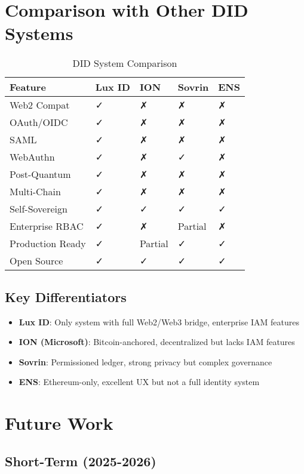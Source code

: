\documentclass[11pt,a4paper]{article}
\begin{document}
\section{Comparison with Other DID Systems}

\begin{table}[h]
\centering
\small
\begin{tabular}{@{}p{2.5cm}p{1.5cm}p{1.5cm}p{1.5cm}p{1.5cm}@{}}
\toprule
\textbf{Feature} & \textbf{Lux ID} & \textbf{ION} & \textbf{Sovrin} & \textbf{ENS} \\ \midrule
Web2 Compat & ✓ & ✗ & ✗ & ✗ \\
OAuth/OIDC & ✓ & ✗ & ✗ & ✗ \\
SAML & ✓ & ✗ & ✗ & ✗ \\
WebAuthn & ✓ & ✗ & ✓ & ✗ \\
Post-Quantum & ✓ & ✗ & ✗ & ✗ \\
Multi-Chain & ✓ & ✗ & ✗ & ✗ \\
Self-Sovereign & ✓ & ✓ & ✓ & ✓ \\
Enterprise RBAC & ✓ & ✗ & Partial & ✗ \\
Production Ready & ✓ & Partial & ✓ & ✓ \\
Open Source & ✓ & ✓ & ✓ & ✓ \\ \bottomrule
\end{tabular}
\caption{DID System Comparison}
\end{table}

\subsection{Key Differentiators}

\begin{itemize}
  \item \textbf{Lux ID}: Only system with full Web2/Web3 bridge, enterprise IAM features
  \item \textbf{ION (Microsoft)}: Bitcoin-anchored, decentralized but lacks IAM features
  \item \textbf{Sovrin}: Permissioned ledger, strong privacy but complex governance
  \item \textbf{ENS}: Ethereum-only, excellent UX but not a full identity system
\end{itemize}

\section{Future Work}

\subsection{Short-Term (2025-2026)}
\end{document}
